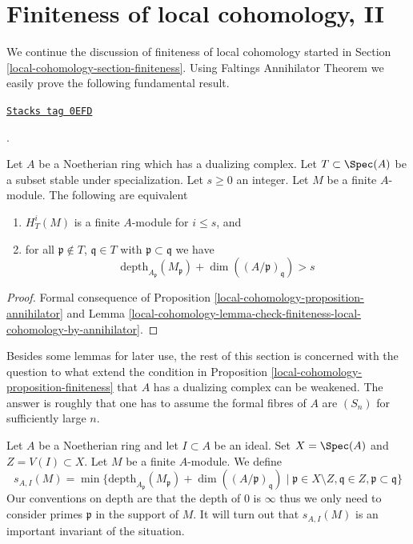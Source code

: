 \section{Finiteness of local cohomology, II}
\label{local-cohomology-section-finiteness-II}
We continue the discussion of finiteness of local cohomology started in
Section \ref{local-cohomology-section-finiteness}. Using
Faltings Annihilator Theorem
we easily prove the following fundamental result.

\begin{proposition}[Finiteness]
\label{local-cohomology-proposition-finiteness}
\href{https://stacks.math.columbia.edu/tag/0EFD}{\texttt{Stacks tag 0EFD}}

\begin{reference}
\cite{Faltings-annulators}.
\end{reference}
Let $A$ be a Noetherian ring which has a dualizing complex.
Let $T \subset \Spec(A)$ be a subset stable under specialization.
Let $s \geq 0$ an integer. Let $M$ be a finite $A$-module.
The following are equivalent
\begin{enumerate}
\item $H^i_T(M)$ is a finite $A$-module for $i \leq s$, and
\item for all $\mathfrak p \not \in T$, $\mathfrak q \in T$ with
$\mathfrak p \subset \mathfrak q$ we have
$$
\text{depth}_{A_\mathfrak p}(M_\mathfrak p) +
\dim((A/\mathfrak p)_\mathfrak q) > s
$$
\end{enumerate}
\end{proposition}

\begin{proof}
Formal consequence of Proposition \ref{local-cohomology-proposition-annihilator} and
Lemma \ref{local-cohomology-lemma-check-finiteness-local-cohomology-by-annihilator}.
\end{proof}

Besides some lemmas for later use, the rest of this section is
concerned with the question to what extend the condition in
Proposition \ref{local-cohomology-proposition-finiteness}
that $A$ has a dualizing complex can be weakened. The answer is roughly
that one has to assume the formal fibres of $A$ are $(S_n)$
for sufficiently large $n$.

\medskip\noindent
Let $A$ be a Noetherian ring and let $I \subset A$ be an ideal.
Set $X = \Spec(A)$ and $Z = V(I) \subset X$. Let $M$ be a finite $A$-module.
We define
\begin{equation}
\label{equation-cutoff}
s_{A, I}(M) =
\min \{
\text{depth}_{A_\mathfrak p}(M_\mathfrak p) + \dim((A/\mathfrak p)_\mathfrak q)
\mid
\mathfrak p \in X \setminus Z, \mathfrak q \in Z,
\mathfrak p \subset \mathfrak q
\}
\end{equation}
Our conventions on depth are that the depth of $0$ is $\infty$
thus we only need to consider primes $\mathfrak p$ in the support
of $M$. It will turn out that $s_{A, I}(M)$ is an important invariant of
the situation.

